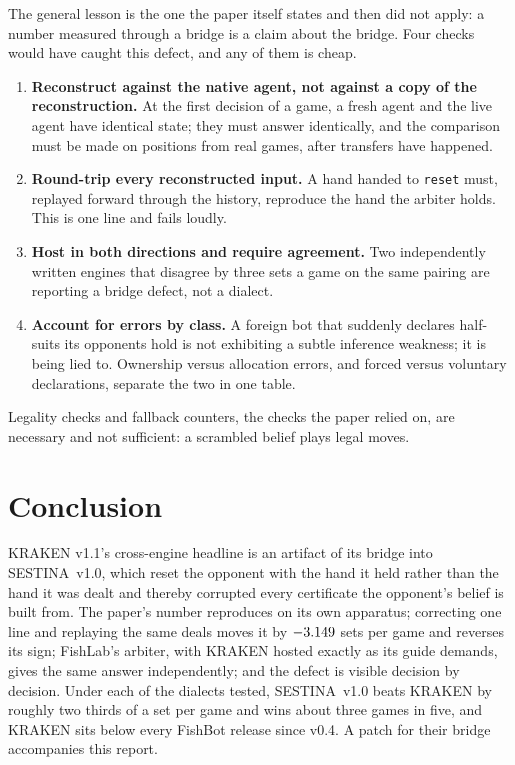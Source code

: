\documentclass[11pt]{article}
\newcommand{\code}[1]{\texttt{#1}}
\newcommand{\sestina}{\mbox{SESTINA v1.0}}
\begin{document}
The general lesson is the one the paper itself states and then did not apply: a number measured
through a bridge is a claim about the bridge. Four checks would have caught this defect, and any of
them is cheap.
\begin{enumerate}
\item \textbf{Reconstruct against the native agent, not against a copy of the reconstruction.} At
      the first decision of a game, a fresh agent and the live agent have identical state; they must
      answer identically, and the comparison must be made on positions from real games, after
      transfers have happened.
\item \textbf{Round-trip every reconstructed input.} A hand handed to \code{reset} must, replayed
      forward through the history, reproduce the hand the arbiter holds. This is one line and fails
      loudly.
\item \textbf{Host in both directions and require agreement.} Two independently written engines
      that disagree by three sets a game on the same pairing are reporting a bridge defect, not a
      dialect.
\item \textbf{Account for errors by class.} A foreign bot that suddenly declares half-suits its
      opponents hold is not exhibiting a subtle inference weakness; it is being lied to. Ownership
      versus allocation errors, and forced versus voluntary declarations, separate the two in one
      table.
\end{enumerate}
Legality checks and fallback counters, the checks the paper relied on, are necessary and not
sufficient: a scrambled belief plays legal moves.

\section{Conclusion}

KRAKEN v1.1's cross-engine headline is an artifact of its bridge into \sestina{}, which reset the
opponent with the hand it held rather than the hand it was dealt and thereby corrupted every
certificate the opponent's belief is built from. The paper's number reproduces on its own apparatus;
correcting one line and replaying the same deals moves it by $-3.149$ sets per game and
reverses its sign; FishLab's arbiter, with KRAKEN hosted exactly as its guide demands, gives the same
answer independently; and the defect is visible decision by decision. Under each of the dialects tested,
\sestina{} beats KRAKEN by roughly two thirds of a set per game and wins about three games in five, and KRAKEN sits below every FishBot release since v0.4. A patch for their bridge
accompanies this report.
\end{document}
